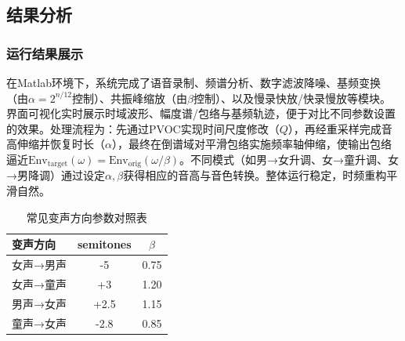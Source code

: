 \documentclass[12pt,a4paper]{article}
\begin{document}
\subsection{结果分析}
\subsubsection{运行结果展示}
在Matlab环境下，系统完成了语音录制、频谱分析、数字滤波降噪、基频变换（由$\alpha=2^{n/12}$控制）、共振峰缩放（由$\beta$控制）、以及慢录快放/快录慢放等模块。界面可视化实时展示时域波形、幅度谱/包络与基频轨迹，便于对比不同参数设置的效果。处理流程为：先通过PVOC实现时间尺度修改（$Q$），再经重采样完成音高伸缩并恢复时长（$\alpha$），最终在倒谱域对平滑包络实施频率轴伸缩，使输出包络逼近$\mathrm{Env}_{\mathrm{target}}(\omega)=\mathrm{Env}_{\mathrm{orig}}(\omega/\beta)$。不同模式（如男→女升调、女→童升调、女→男降调）通过设定$\alpha,\beta$获得相应的音高与音色转换。整体运行稳定，时频重构平滑自然。
\begin{table}[htbp]
  \centering %
  \caption{常见变声方向参数对照表} %
  \label{table:voice_conversion} %
  \begin{tabular}{lcc} %
    \toprule %
    变声方向 & semitones & $\beta$ \\
    \midrule %
    女声→男声 & -5    & 0.75 \\
    女声→童声 & +3    & 1.20 \\
    男声→女声 & +2.5  & 1.15 \\
    童声→女声 & -2.8  & 0.85 \\
    \bottomrule %
  \end{tabular}
\end{table}
\end{document}
